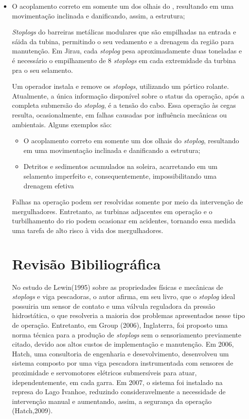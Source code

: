 \begin{itemize}
  \item O acoplamento correto em somente um dos olhais do ,
  resultando em uma movimentação inclinada e danificando, assim, a estrutura;

\textit{Stoplogs} do barreiras metálicas modulares que são empilhadas na entrada
e sáida da tubina, permitindo o seu vedamento e a drenagem da região para
manutenção. Em Jirau, cada \textit{stoplog} pesa aproximadamente duas toneladas
e é necessário o empilhamento de 8 \textit{stoplogs} em cada extremidade da
turbina pra o seu selamento.

Um operador instala e remove os \textit{stoplogs}, utilizando um pórtico
rolante. Atualmente, a única informação disponível sobre o status da operação,
após a completa submersão do \textit{stoplog}, é a tensão do cabo. Essa operação
às cegas resulta, ocasionalmente, em falhas causadas por influência mecânicas ou
ambientais. Alguns exemplos são:
\begin{itemize}
  \item O acoplamento correto em somente um dos olhais do \textit{stoplog},
  resultando em uma movimentação inclinada e danificando a estrutura;
  \item Detritos e sedimentos acumulados na soleira, acarretando em um selamento
  imperfeito e, consequentemente, impossibilitando uma drenagem efetiva
\end{itemize}

Falhas na operação podem ser resolvidas somente por meio da intervenção de
mergulhadores. Entretanto, as turbinas adjacentes em operação e o turbilhamento
do rio podem ocasionar em acidentes, tornando essa medida uma tarefa de alto risco à vida dos
mergulhadores.

\section{Revisão Bibiliográfica}

No estudo de Lewin(1995) sobre as propriedades físicas e mecânicas de 
\textit{stoplogs} e viga pescadoras, o autor afirma, em seu livro, que o
\textit{stoplog} ideal possuiria um sensor de contato e uma válvula reguladora
da pressão hidrostática, o que resolveria a maioria dos problemas apresentados
nesse tipo de operação. Entretanto, em Group (2006), Inglaterra, foi proposto
uma norma técnica para a produção de \textit{stoplogs} sem o sensoriamento
previamente citado, devido aos altos custos de implementação e manutenção. Em
2006, Hatch, uma consultoria de engenharia e desevolvimento, desenvolveu um
sistema composto por uma viga pescadora instrumentada com sensores de
proximidade e servomotores elétricos submersíveis para atuar, idependentemente,
em cada garra. Em 2007, o sistema foi instalado na represa do Lago Ivanhoe,
reduzindo consideravelmente a necessidade de intervenção manual e aumentando,
assim, a segurança da operação (Hatch,2009).


\end{itemize}

